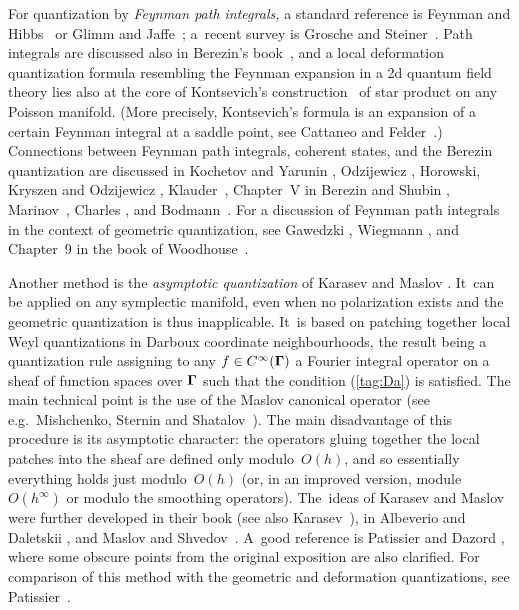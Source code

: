\documentclass[12pt]{amsart}
\numberwithin{equation}{section}
\theoremstyle{remark}
\newcommand\Omg{{\bigam}}   %
\newcommand{\bigam}{\mbox{\boldmath $\Gamma$}}
\begin{document}
For quantization by {\it Feynman path integrals,\/} a standard reference is
Feynman and Hibbs~\cite{bib:FeyH} or Glimm and Jaffe~\cite{bib:Jaffe}; a~recent
survey is Grosche and Steiner~\cite{bib:Grosche}. Path integrals
are discussed also in Berezin's book~\cite{bib:BerBk}, and a local deformation
quantization formula resembling the Feynman expansion in a 2d quantum field
theory lies also at the core of Kontsevich's construction~\cite{bib:Kon} of
star product on any Poisson manifold. (More precisely, Kontsevich's formula is
an expansion of a certain Feynman integral at a saddle point, see Cattaneo and
Felder~\cite{bib:CattFeld}.) Connections between Feynman path integrals,
coherent states, and the Berezin quantization are discussed in Kochetov and
Yarunin \cite{bib:KoYar}, Odzijewicz \cite{bib:OdziB}, Horowski, Kryszen and
Odzijewicz  \cite{bib:OdziC}, Klauder~\cite{bib:Klaud}, Chapter~V in Berezin
and Shubin \cite{bib:+BerShu}, Marinov~\cite{bib:MarinB}, Charles
\cite{bib:+Charl}, and Bodmann~\cite{bib:Bodm}. For a discussion of
Feynman path integrals in the context of geometric quantization, see Gawedzki
\cite{bib:GaweF}, Wiegmann \cite{bib:Weigh}, and Chapter~9 in the book of
Woodhouse~\cite{bib:Woodh}.

Another method is the {\it asymptotic quantization\/} of Karasev and Maslov
\cite{bib:KMab}. It~can be applied on any symplectic manifold, even when no
polarization exists and the geometric quantization is thus inapplicable. It~is
based on patching together local Weyl quantizations in Darboux coordinate
neighbourhoods, the result being a quantization rule assigning to any $f\in
C^\infty(\Omg)$ a Fourier integral operator on a sheaf of function spaces
over $\Omg$ such that the condition (\ref{tag:Da}) is satisfied. The main
technical point is the use of the Maslov canonical operator (see
e.g.~Mishchenko, Sternin and Shatalov~\cite{bib:Mis}). The main disadvantage of
this procedure is its asymptotic character: the operators gluing together the
local patches into the sheaf are defined only modulo~$O(h)$, and so essentially
everything holds just modulo~$O(h)$ (or, in an improved version, module
$O(h^\infty)$ or modulo the smoothing operators). The~ideas of Karasev and
Maslov were further developed in their book \cite{bib:KMbk} (see also
Karasev~\cite{bib:Karax}), in Albeverio and Daletskii \cite{bib:AlbD}, and
Maslov and Shvedov~\cite{bib:MaslSh}. A~good reference is Patissier and Dazord
\cite{bib:PatDa}, where some obscure points from the original exposition
\cite{bib:KMab} are also clarified. For comparison of this method with the
geometric and deformation quantizations, see Patissier~\cite{bib:Patis}.
\end{document}

